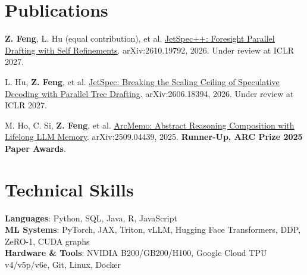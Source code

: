 \documentclass[letterpaper,11pt]{article}
\begin{document}
\section{Publications}
 \begin{itemize}[leftmargin=0.15in, label={}, itemsep=1pt, parsep=0pt, topsep=2pt]
    \small{
    \item \textbf{Z. Feng}, L. Hu (equal contribution), et al. \href{https://arxiv.org/abs/2610.19792}{\underline{JetSpec++: Foresight Parallel Drafting with Self Refinements}}. arXiv:2610.19792, 2026. Under review at ICLR 2027.
    \item L. Hu, \textbf{Z. Feng}, et al. \href{https://arxiv.org/abs/2606.18394}{\underline{JetSpec: Breaking the Scaling Ceiling of Speculative Decoding with Parallel Tree Drafting}}. arXiv:2606.18394, 2026. Under review at ICLR 2027.
    \item M. Ho, C. Si, \textbf{Z. Feng}, et al. \href{https://arxiv.org/abs/2509.04439}{\underline{ArcMemo: Abstract Reasoning Composition with Lifelong LLM Memory}}. arXiv:2509.04439, 2025. \textbf{Runner-Up, ARC Prize 2025 Paper Awards}.
    }
 \end{itemize}
 \vspace{-12pt}

\section{Technical Skills}
 \begin{itemize}[leftmargin=0.15in, label={}]
    \small{\item{
     \textbf{Languages}{: Python, SQL, Java, R, JavaScript} \\
     \textbf{ML Systems}{: PyTorch, JAX, Triton, vLLM, Hugging Face Transformers, DDP, ZeRO-1, CUDA graphs} \\
     \textbf{Hardware \& Tools}{: NVIDIA B200/GB200/H100, Google Cloud TPU v4/v5p/v6e, Git, Linux, Docker}
    }}
 \end{itemize}
\end{document}
